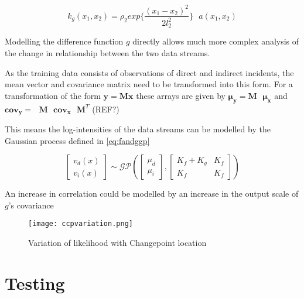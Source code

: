 \documentclass[a4paper,11pt]{report}
\begin{document}
\begin{equation}
k_g(x_1,x_2) = \rho_2 exp\{\frac{(x_1-x_2)^2}{2 l_2^2}\} \text{ } a(x_1,x_2)
\end{equation}


Modelling the difference function \(g\) directly allows much more complex analysis of the change in relationship between the two data streams. 

As the training data consists of observations of direct and indirect incidents, the mean vector and covariance matrix need to be transformed into this form. For a transformation of the form \(\mathbf{y}= \mathbf{M} \mathbf{x}\) these arrays are given by \(\boldsymbol{\mu_y}= \mathbf{M}\text{ }\boldsymbol{\mu_x}\) and \(\mathbf{cov_y}= \text{ }\mathbf{M}\text{ } \mathbf{cov_x} \text{ } \mathbf{M}^{T}\) (REF?)

This means the log-intensities of the data streams can be modelled by the Gaussian process defined in \ref{eq:fandggp}

\begin{equation} \label{eq:fandggp}
\left[ \begin{array}{cc}
v_d(x)  \\
v_i(x) \end{array} \right] \sim \mathcal{G}\mathcal{P} \left( \left[ \begin{array}{cc}
\mu_d  \\
\mu_i \end{array} \right], \left[ \begin{array}{cc}
K_f + K_g & K_f  \\
K_f  & K_f \end{array} \right] \right)
\end{equation}



An increase in correlation could be modelled by an increase in the output scale of \(g\)'s covariance




\begin{figure}
\centering
\texttt{[image: ccpvariation.png]}
\caption{Variation of likelihood with Changepoint location}
\label{fig:ccpvariation}
\end{figure}
\chapter{Testing}

\end{document}
